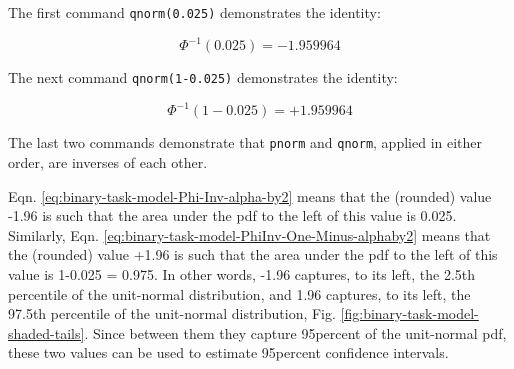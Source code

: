 \documentclass[
]{book}
\begin{document}
The first command \texttt{qnorm(0.025)} demonstrates the identity:

\begin{equation} 
\Phi^{-1}(0.025)=-1.959964
\label{eq:binary-task-model-Phi-Inv-alpha-by2}
\end{equation}

The next command \texttt{qnorm(1-0.025)} demonstrates the identity:

\begin{equation} 
\Phi^{-1}(1-0.025)=+1.959964
\label{eq:binary-task-model-PhiInv-One-Minus-alphaby2}
\end{equation}

The last two commands demonstrate that \texttt{pnorm} and \texttt{qnorm}, applied in either order, are inverses of each other.

Eqn. \eqref{eq:binary-task-model-Phi-Inv-alpha-by2} means that the (rounded) value -1.96 is such that the area under the pdf to the left of this value is 0.025. Similarly, Eqn. \eqref{eq:binary-task-model-PhiInv-One-Minus-alphaby2} means that the (rounded) value +1.96 is such that the area under the pdf to the left of this value is 1-0.025 = 0.975. In other words, -1.96 captures, to its left, the 2.5th percentile of the unit-normal distribution, and 1.96 captures, to its left, the 97.5th percentile of the unit-normal distribution, Fig. \ref{fig:binary-task-model-shaded-tails}. Since between them they capture 95percent of the unit-normal pdf, these two values can be used to estimate 95percent confidence intervals.
\end{document}
